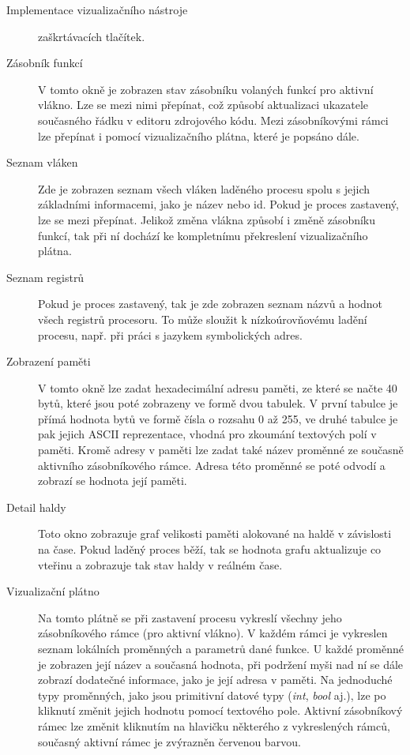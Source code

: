 \documentclass[bc,male,python,dept460]{diploma}						%
\begin{document}
\begin{section}{Implementace vizualizačního nástroje}
\begin{description}
			zaškrtávacích tlačítek.
		\item[Zásobník funkcí] V tomto okně je zobrazen stav zásobníku volaných funkcí pro aktivní vlákno. Lze se mezi nimi přepínat, což způsobí aktualizaci
			ukazatele současného řádku v editoru zdrojového kódu. Mezi zásobníkovými rámci lze přepínat i pomocí vizualizačního plátna, které je popsáno dále.
		\item[Seznam vláken] Zde je zobrazen seznam všech vláken laděného procesu spolu s jejich základními informacemi, jako je název nebo id. Pokud je proces
			zastavený, lze se mezi přepínat. Jelikož změna vlákna způsobí i změně zásobníku funkcí, tak při ní dochází ke kompletnímu překreslení vizualizačního
			plátna.
		\item[Seznam registrů] %
			Pokud je proces zastavený, tak je zde zobrazen seznam názvů a hodnot všech registrů procesoru. To může sloužit k nízkoúrovňovému ladění procesu, např.
			při práci s jazykem symbolických adres.
		\item[Zobrazení paměti] V tomto okně lze zadat hexadecimální adresu paměti, ze které se načte 40 bytů, které jsou poté zobrazeny ve formě dvou tabulek.
			V první tabulce je přímá hodnota bytů ve formě čísla o rozsahu 0 až 255, ve druhé tabulce je pak jejich ASCII reprezentace, vhodná pro zkoumání textových
			polí v paměti. Kromě adresy v paměti lze zadat také název proměnné ze současně aktivního zásobníkového rámce. Adresa této proměnné se poté odvodí
			a zobrazí se hodnota její paměti.
		\item[Detail haldy] %
			Toto okno zobrazuje graf velikosti paměti alokované na haldě v závislosti na čase. Pokud laděný proces běží, tak se hodnota grafu aktualizuje co vteřinu
			a zobrazuje tak stav haldy v reálném čase.
		\item[Vizualizační plátno] Na tomto plátně se při zastavení procesu vykreslí všechny jeho zásobníkového rámce (pro aktivní vlákno). V každém rámci je
			vykreslen seznam lokálních proměnných a parametrů dané funkce. U každé proměnné je zobrazen její název a současná hodnota, při podržení myši nad ní se dále
			zobrazí dodatečné informace, jako je její adresa v paměti. Na jednoduché typy proměnných, jako jsou primitivní datové typy (\textit{int}, \textit{bool}
			aj.), lze po kliknutí změnit jejich hodnotu pomocí textového pole. Aktivní zásobníkový rámec lze změnit kliknutím na hlavičku některého z vykreslených
			rámců, současný aktivní rámec je zvýrazněn červenou barvou.
		
	\end{description}

\end{section}
\end{document}
